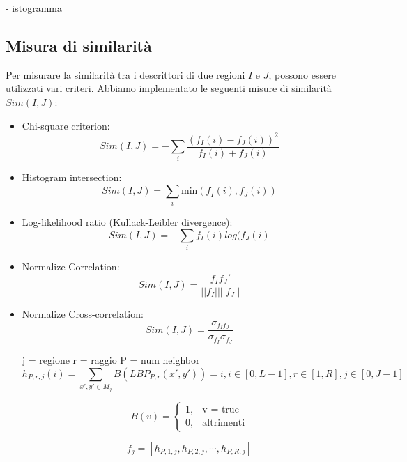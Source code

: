 - istogramma

\subsection{Misura di similarità}

Per misurare la similarità tra i descrittori di due regioni $I$ e $J$, possono essere utilizzati vari criteri. Abbiamo implementato le seguenti misure di similarità $Sim(I, J)$:

\begin{itemize}

\item Chi-square criterion:
\begin{equation}
Sim(I, J) = -  \sum_{i} \frac{ (f_{I}(i) - f_{J}(i) )^2}{f_{I}(i) + f_{J}(i)}
\end{equation}

\item Histogram intersection:
\begin{equation}
Sim(I, J) = \sum_{i} \mbox{min}(f_{I}(i),f_{J}(i))
\end{equation}

\item Log-likelihood ratio (Kullack-Leibler 
divergence):
\begin{equation}
Sim(I, J) = - \sum_{i} f_{I}(i)log(f_{J}(i)
\end{equation}

\item Normalize Correlation:
\begin{equation}
Sim(I, J) = \frac{f_{I}f_{J}'}{||f_{I}|| ||f_{J}||}
\end{equation}

\item Normalize Cross-correlation:
\begin{equation}
Sim(I, J) = \frac{\sigma_{f_{I}f_{J}}}{\sigma_{f_{I}}\sigma_{f_{J}}}
\end{equation}





j = regione
r = raggio
P = num neighbor
\begin{equation}
h_{P,r,j}(i) = \sum_{x',y' \in M_j} B(LBP_{P,r}(x', y')) = i, i \in  [0, L-1 ], r \in [1, R], j \in [0, J-1]
\end{equation}

\begin{equation}
B(v) = 	\begin{cases} 1, & \mbox{v = true} \\ 0, & \mbox{altrimenti} \end{cases}
\end{equation}

\begin{equation}
f_{j} = [h_{P, 1, j}, h_{P, 2, j}, \cdots, h_{P, R, j}]
\end{equation}

\end{itemize}


